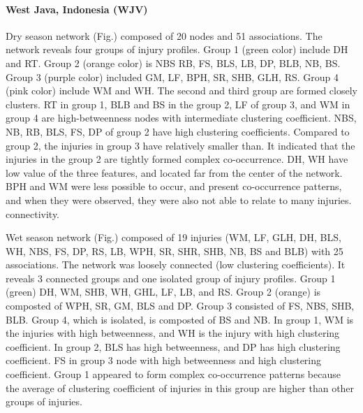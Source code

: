 \paragraph{West Java, Indonesia (WJV)}
 
Dry season network (Fig.) composed of 20 nodes and 51 associations. The network reveals four groups of injury profiles. Group 1 (green color) include DH and RT. Group 2 (orange color) is NBS RB, FS, BLS, LB, DP, BLB, NB, BS. Group 3 (purple color) included GM, LF, BPH, SR, SHB, GLH, RS. Group 4 (pink color) include WM and WH.  The second and third group are formed closely clusters.  RT in group 1, BLB and BS in the group 2, LF of group 3, and WM in group 4 are high-betweenness nodes with intermediate clustering coefficient.  NBS, NB, RB, BLS, FS, DP of group 2 have high clustering coefficients. Compared to group 2, the injuries in group 3 have relatively smaller than. It indicated that the injuries in the group 2 are tightly formed complex co-occurrence.  DH, WH have low value of the three features, and located far from the center of the network. BPH and WM were less possible to occur, and present co-occurrence patterns, and when they were observed, they were also not able to relate to many injuries. connectivity.

Wet season network (Fig.) composed of 19 injuries (WM, LF, GLH, DH, BLS, WH, NBS, FS, DP, RS, LB, WPH, SR, SHR, SHB, NB, BS and BLB) with 25 associations. The network was loosely connected (low clustering coefficients). It reveals 3 connected groups and one isolated group of injury profiles. Group 1 (green) DH, WM, SHB, WH, GHL, LF, LB, and RS. Group 2 (orange) is composted of WPH, SR, GM, BLS and DP. Group 3 consisted of FS, NBS, SHB, BLB. Group 4, which is isolated, is composted of BS and NB. In group 1, WM is the injuries with high betweenness, and WH is the injury with high clustering coefficient. In group 2, BLS has high betweenness, and DP has high clustering coefficient. FS in group 3 node with high betweenness and high clustering coefficient. Group 1 appeared to form complex co-occurrence patterns because the average of clustering coefficient of injuries in this group are higher than other groups of injuries.  

